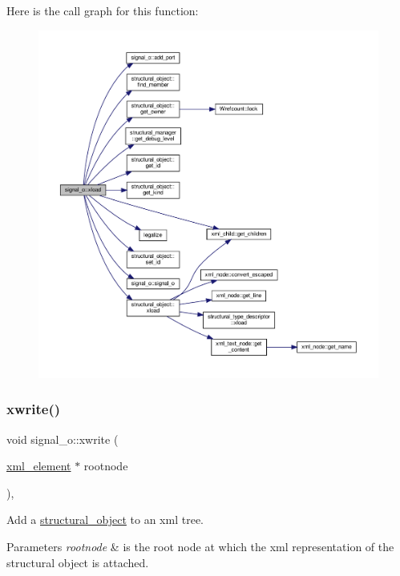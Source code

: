 Here is the call graph for this function\+:
\nopagebreak
\begin{figure}[H]
\begin{center}
\leavevmode
\includegraphics[width=350pt]{db/d5c/classsignal__o_af1096352917fd77b01263f101c5f9465_cgraph}
\end{center}
\end{figure}
\mbox{\label{classsignal__o_af828ace28e381c16a88a79b330e2e5b2}} 
\subsubsection{\texorpdfstring{xwrite()}{xwrite()}}
{\footnotesize\ttfamily void signal\+\_\+o\+::xwrite (\begin{DoxyParamCaption}\item[{\hyperlink{classxml__element}{xml\+\_\+element} $\ast$}]{rootnode }\end{DoxyParamCaption})\hspace{0.3cm}{\ttfamily [override]}, {\ttfamily [virtual]}}



Add a \hyperlink{classstructural__object}{structural\+\_\+object} to an xml tree. 


\begin{DoxyParams}{Parameters}
{\em rootnode} & is the root node at which the xml representation of the structural object is attached. \\
\hline
\end{DoxyParams}


